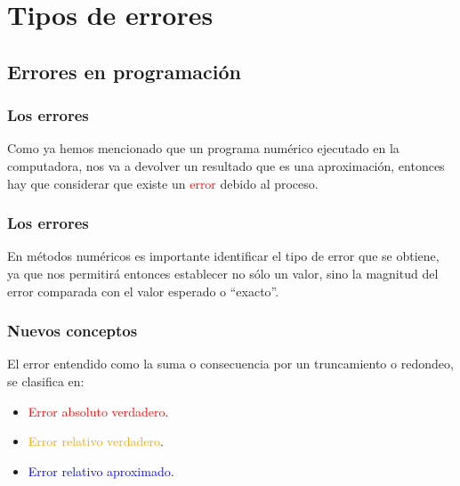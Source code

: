 \section{Tipos de errores}
\subsection{Errores en programación}
\begin{frame}
\frametitle{Los errores}
Como ya hemos mencionado que un programa numérico ejecutado en la computadora, nos va a devolver un resultado que es una aproximación, entonces hay que considerar que existe un \textcolor{red}{error} debido al proceso.
\end{frame}
\begin{frame}
\frametitle{Los errores}
En métodos numéricos es importante identificar el tipo de error que se obtiene, ya que nos permitirá entonces establecer no sólo un valor, sino la magnitud del error comparada con el valor esperado o \enquote{exacto}.
\end{frame}
\begin{frame}
\frametitle{Nuevos conceptos}
El error entendido como la suma o consecuencia por un truncamiento o redondeo, se clasifica en:
\begin{itemize}[<+->]
\item \textcolor{red}{Error absoluto verdadero}.
\item \textcolor{orange}{Error relativo verdadero}.
\item \textcolor{blue}{Error relativo aproximado}.
\end{itemize}
\end{frame}
